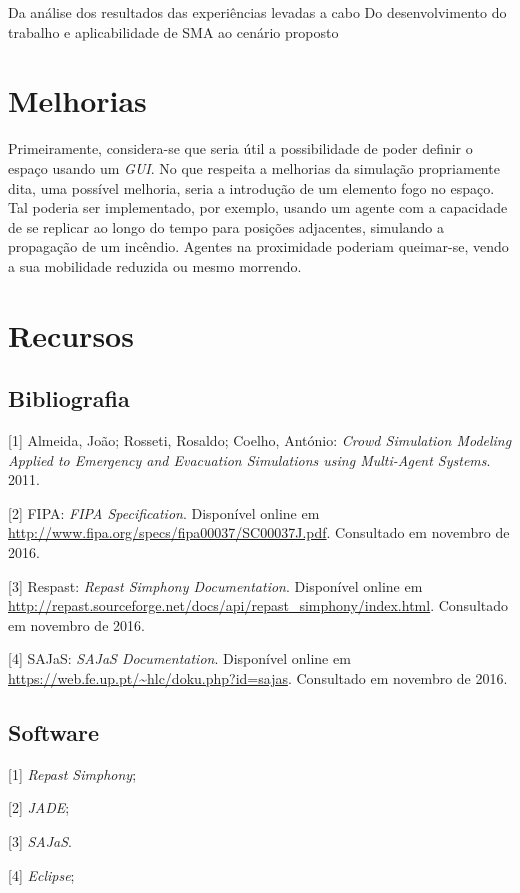 \documentclass[12pt]{article}
\begin{document}
\begin{titlepage}
Da análise dos resultados das experiências levadas a cabo
Do desenvolvimento do trabalho e aplicabilidade de SMA ao cenário proposto

\section{Melhorias}

Primeiramente, considera-se que seria útil a possibilidade de poder definir o espaço usando um \textit{GUI}.
No que respeita a melhorias da simulação propriamente dita, uma possível melhoria, seria a introdução de um elemento fogo no espaço. Tal poderia ser implementado, por exemplo, usando um agente com a capacidade de se replicar ao longo do tempo para posições adjacentes, simulando a propagação de um incêndio. Agentes na proximidade poderiam queimar-se, vendo a sua mobilidade reduzida ou mesmo morrendo.



\section{Recursos}
\subsection{Bibliografia}
[1] Almeida, João; Rosseti, Rosaldo; Coelho, António: \textit{Crowd Simulation Modeling Applied to Emergency and Evacuation Simulations using Multi-Agent Systems}. 2011.

[2] FIPA: \textit{FIPA Specification}. Disponível online em \url{http://www.fipa.org/specs/fipa00037/SC00037J.pdf}. Consultado em novembro de 2016.

[3] Respast: \textit{Repast Simphony Documentation}. Disponível online em \url{http://repast.sourceforge.net/docs/api/repast_simphony/index.html}. Consultado em novembro de 2016.

[4] SAJaS: \textit{SAJaS Documentation}. Disponível online em \url{https://web.fe.up.pt/~hlc/doku.php?id=sajas}. Consultado em novembro de 2016.


\subsection{Software}
[1] \textit{Repast Simphony};

[2] \textit{JADE};

[3] \textit{SAJaS}.

[4] \textit{Eclipse};

\end{titlepage}
\end{document}
